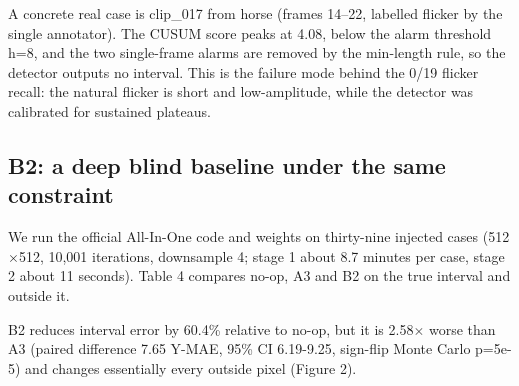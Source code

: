 \documentclass[twocolumn,10pt]{svjour3}
\begin{document}
A concrete real case is clip\_017 from horse (frames 14–22, labelled flicker by the single annotator). The CUSUM score peaks at 4.08, below the alarm threshold h=8, and the two single-frame alarms are removed by the min-length rule, so the detector outputs no interval. This is the failure mode behind the 0/19 flicker recall: the natural flicker is short and low-amplitude, while the detector was calibrated for sustained plateaus.


\subsection{B2: a deep blind baseline under the same constraint}

We run the official All-In-One code and weights on thirty-nine injected cases (512$\times$512, 10,001 iterations, downsample 4; stage 1 about 8.7 minutes per case, stage 2 about 11 seconds). Table 4 compares no-op, A3 and B2 on the true interval and outside it.


\begin{table}[t]
\centering
\caption{Deep blind baseline (All-In-One) vs local write-back on thirty-nine injected cases.}
\end{table}

B2 reduces interval error by 60.4\% relative to no-op, but it is 2.58$\times$ worse than A3 (paired difference 7.65 Y-MAE, 95\% CI 6.19-9.25, sign-flip Monte Carlo p=5e-5) and changes essentially every outside pixel (Figure 2).
\end{document}
